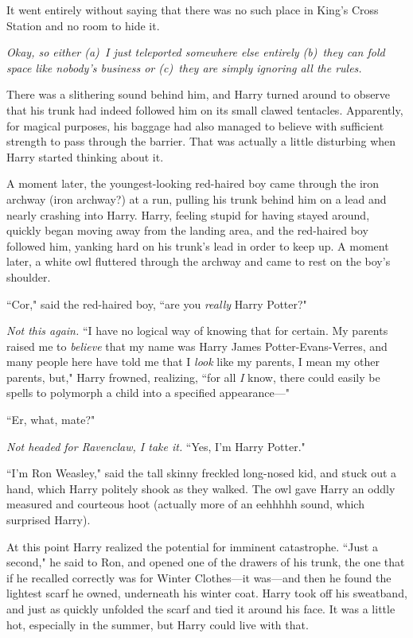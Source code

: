 It went entirely without saying that there was no such place in King's Cross Station and no room to hide it.

\emph{Okay, so either (a)~I just teleported somewhere else entirely (b)~they can fold space like nobody's business or (c)~they are simply ignoring all the rules.}

There was a slithering sound behind him, and Harry turned around to observe that his trunk had indeed followed him on its small clawed tentacles. Apparently, for magical purposes, his baggage had also managed to believe with sufficient strength to pass through the barrier. That was actually a little disturbing when Harry started thinking about it.

A moment later, the youngest-looking red-haired boy came through the iron archway (iron archway?) at a run, pulling his trunk behind him on a lead and nearly crashing into Harry. Harry, feeling stupid for having stayed around, quickly began moving away from the landing area, and the red-haired boy followed him, yanking hard on his trunk's lead in order to keep up. A moment later, a white owl fluttered through the archway and came to rest on the boy's shoulder.

``Cor," said the red-haired boy, ``are you \emph{really} Harry Potter?"

\emph{Not this again.} ``I have no logical way of knowing that for certain. My parents raised me to \emph{believe} that my name was Harry James Potter-Evans-Verres, and many people here have told me that I \emph{look} like my parents, I mean my other parents, but," Harry frowned, realizing, ``for all \emph{I} know, there could easily be spells to polymorph a child into a specified appearance—"

``Er, what, mate?"

\emph{Not headed for Ravenclaw, I take it.} ``Yes, I'm Harry Potter."

``I'm Ron Weasley," said the tall skinny freckled long-nosed kid, and stuck out a hand, which Harry politely shook as they walked. The owl gave Harry an oddly measured and courteous hoot (actually more of an eehhhhh sound, which surprised Harry).

At this point Harry realized the potential for imminent catastrophe. ``Just a second," he said to Ron, and opened one of the drawers of his trunk, the one that if he recalled correctly was for Winter Clothes—it was—and then he found the lightest scarf he owned, underneath his winter coat. Harry took off his sweatband, and just as quickly unfolded the scarf and tied it around his face. It was a little hot, especially in the summer, but Harry could live with that.

